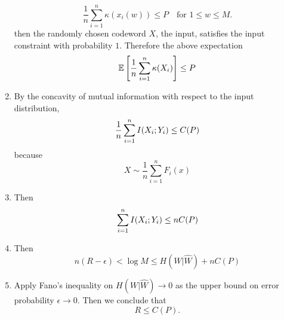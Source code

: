 \documentclass[../main.tex]{subfiles}
\begin{document}
\begin{enumerate}
\[    \frac{1}{n}\sum_{i=1}^n\kappa(x_i(w))\leq P \quad \text{for $1\leq w\leq M$}.
    \]
    then the randomly chosen codeword $X$, the input, satisfies the input constraint with probability $1$. Therefore the above expectation \[
    \mathbb{E} \left[\frac{1}{n}\sum_{i=1}^n \kappa(X_i)\right] \leq P
    \]
    \item By the concavity of mutual information with respect to the input distribution,\[
    \frac{1}{n}\sum_{i=1}^n I(X_i;Y_i) \leq C(P)
    \]
    because \[
    X\sim \frac{1}{n}\sum_{i=1}^n F_i(x)
    \]
    \item Then \[
    \sum_{i=1}^n I(X_i;Y_i) \leq nC(P)
    \]
    \item Then \[
    n(R-\epsilon) < \log M \leq H(W|\hat W) + nC(P)
    \]
    \item Apply Fano's inequality on $H(W|\hat W) \to 0$ as the upper bound on error probability $\epsilon\to 0$. Then we conclude that \[
    R\leq C(P).
    \]
\end{enumerate}
\end{document}
